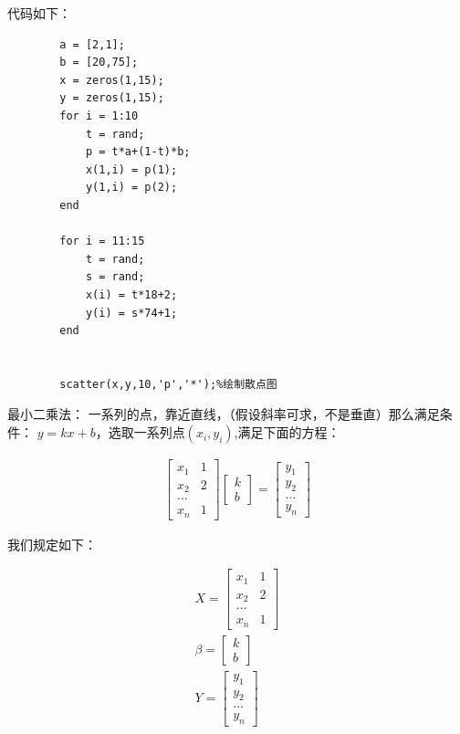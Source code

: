 \documentclass{article}
\begin{document}
    代码如下：
    \begin{lstlisting}
        a = [2,1];
        b = [20,75];
        x = zeros(1,15);
        y = zeros(1,15);
        for i = 1:10 
            t = rand;
            p = t*a+(1-t)*b;
            x(1,i) = p(1);
            y(1,i) = p(2);
        end

        for i = 11:15
            t = rand;
            s = rand;
            x(i) = t*18+2;
            y(i) = s*74+1;
        end


        scatter(x,y,10,'p','*');%绘制散点图
    \end{lstlisting}

    最小二乘法：
    一系列的点，靠近直线，（假设斜率可求，不是垂直）那么满足条件：
    $y=kx+b$，选取一系列点$(x_i,y_i)$,满足下面的方程：

    \begin{align}
        \begin{bmatrix}
            x_1 & 1\\
            x_2 & 2\\
            \dots\\
            x_n & 1
        \end{bmatrix}
        \begin{bmatrix}
            k\\
            b
        \end{bmatrix}
        =
        \begin{bmatrix}
            y_1\\
            y_2\\
            \dots\\
            y_n
        \end{bmatrix}
    \end{align}
    
    我们规定如下：

    \begin{align}
        X=
        \begin{bmatrix}
            x_1 & 1\\
            x_2 & 2\\
            \dots\\
            x_n & 1
        \end{bmatrix}\nonumber\\
        \beta=
        \begin{bmatrix}
            k\\
            b
        \end{bmatrix}\nonumber\\
        Y=
        \begin{bmatrix}
            y_1\\
            y_2\\
            \dots\\
            y_n
        \end{bmatrix}\nonumber
    \end{align}
\end{document}
